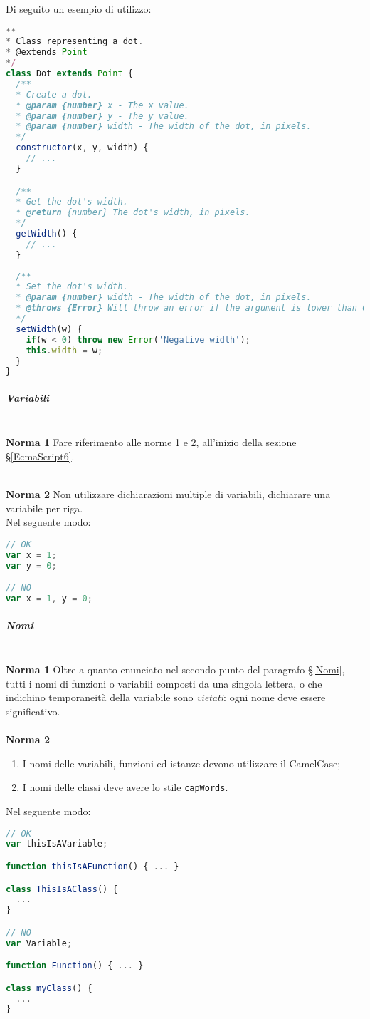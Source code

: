 Di seguito un esempio di utilizzo:
\begin{lstlisting}[language=JavaScript]
**
* Class representing a dot.
* @extends Point
*/
class Dot extends Point {
  /**
  * Create a dot.
  * @param {number} x - The x value.
  * @param {number} y - The y value.
  * @param {number} width - The width of the dot, in pixels.
  */
  constructor(x, y, width) {
    // ...
  }

  /**
  * Get the dot's width.
  * @return {number} The dot's width, in pixels.
  */
  getWidth() {
    // ...
  }
  
  /**
  * Set the dot's width.
  * @param {number} width - The width of the dot, in pixels.
  * @throws {Error} Will throw an error if the argument is lower than 0.
  */
  setWidth(w) {
    if(w < 0) throw new Error('Negative width');
    this.width = w;
  }
}
\end{lstlisting}

\subparagraph{Variabili}\-\\
\textbf{Norma 1}
Fare riferimento alle norme 1 e 2, all'inizio della sezione §\ref{EcmaScript6}.

\-\\
\textbf{Norma 2}
Non utilizzare dichiarazioni multiple di variabili, dichiarare una variabile per riga.\\
Nel seguente modo:
\begin{lstlisting}[language=JavaScript]
// OK
var x = 1;
var y = 0;

// NO
var x = 1, y = 0;
\end{lstlisting}


\subparagraph{Nomi}\-\\
\textbf{Norma 1} Oltre a quanto enunciato nel secondo punto del paragrafo §\ref{Nomi}, tutti i nomi di funzioni o variabili composti da una singola lettera, o che indichino temporaneità della variabile sono \textit{vietati}: ogni nome deve essere significativo.\\
\-\\
\textbf{Norma 2} 
\begin{enumerate}
	\item I nomi delle variabili, funzioni ed istanze devono utilizzare il CamelCase;
	\item I nomi delle classi deve avere lo stile \texttt{capWords}.
\end{enumerate}
Nel seguente modo:
\begin{lstlisting}[language=JavaScript]
// OK
var thisIsAVariable;

function thisIsAFunction() { ... }

class ThisIsAClass() {
  ...
}

// NO
var Variable;

function Function() { ... }

class myClass() {
  ...
}
\end{lstlisting}

